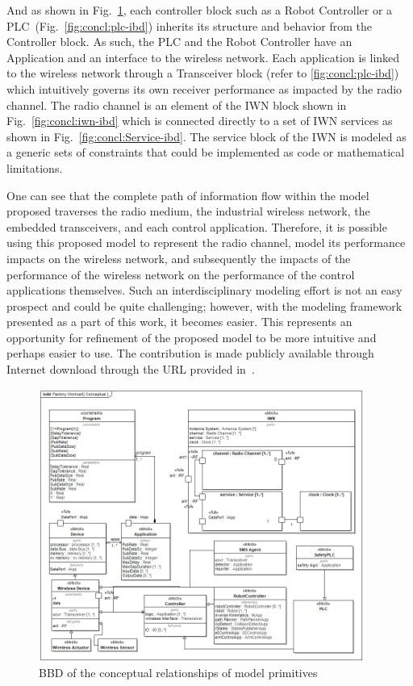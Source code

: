 And as shown in Fig.~\ref{fig:concl:conceptual}, each controller block such as a Robot Controller or a PLC~(Fig.~\ref{fig:concl:plc-ibd}) inherits its structure and behavior from the Controller block.  As such, the PLC and the Robot Controller have an Application and an interface to the wireless network.  Each application is linked to the wireless network through a Transceiver block (refer to \ref{fig:concl:plc-ibd}) which intuitively governs its own receiver performance as impacted by the radio channel.  The radio channel is an element of the IWN block shown in Fig.~\ref{fig:concl:iwn-ibd} which is connected directly to a set of IWN services as shown in Fig.~\ref{fig:concl:Service-ibd}. The service block of the IWN is modeled as a generic sets of constraints that could be implemented as code or mathematical limitations.  

One can see that the complete path of information flow within the model proposed traverses the radio medium, the industrial wireless network, the embedded transceivers, and each control application. Therefore, it is possible using this proposed model to represent the radio channel, model its performance impacts on the wireless network, and subsequently the impacts of the performance of the wireless network on the performance of the control applications themselves.  Such an interdisciplinary modeling effort is not an easy prospect and could be quite challenging; however, with the modeling framework presented as a part of this work, it becomes easier.  This represents an opportunity for refinement of the proposed model to be more intuitive and perhaps easier to use.  The contribution is made publicly available through Internet download through the URL provided in~\cite{Candell2018SysML.DATA}.

\begin{figure}[!th]
	\centering
	\includegraphics[width=0.95\textwidth]{chapter-conclusions/images/Conceptual}
	\caption{BBD of the conceptual relationships of model primitives}
	\label{fig:concl:conceptual}
\end{figure}

